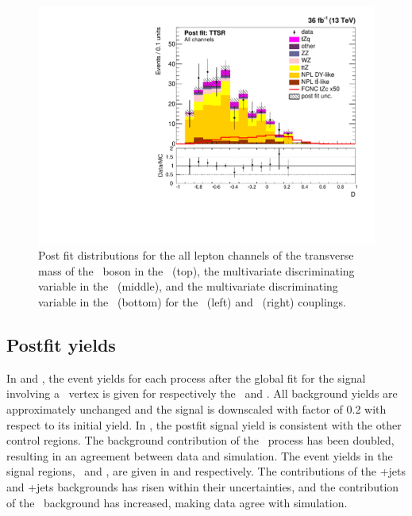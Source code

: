 \begin{figure}[htbp]
	\includegraphics[width=0.49\linewidth]{6_Search/Figures/ZctFit/shapes_fit_s_4_all_error_trial.pdf}
	\caption{Post fit distributions for the all lepton channels of the transverse mass of the \PW\ boson in the \WZCR\ (top), the multivariate discriminating variable in the \STSR\ (middle), and the multivariate discriminating variable in the \TTSR\ (bottom) for the \Zut\ (left) and \Zct\ (right) couplings. }
	\label{fig:shapesfitALL}
\end{figure}

\clearpage
\subsection{Postfit yields}
\label{sec:postfityields}
In  and , the  event yields for each process after the global fit for the signal involving a \Zut\ vertex is given for respectively the \STCR\ and \TTCR. All background yields are approximately unchanged and the signal is downscaled with factor of 0.2 with respect to its initial yield. In , the postfit signal yield is consistent with the other control regions. The background contribution of the \NPL\ process has been doubled, resulting in an agreement between data and simulation. The event yields in the signal regions, \STSR\ and \TTSR, are given in  and  respectively. The contributions of the \WZ+jets and \ttZ+jets backgrounds has risen within their uncertainties, and the contribution of the \NPL\ background has increased, making data agree with simulation. 

